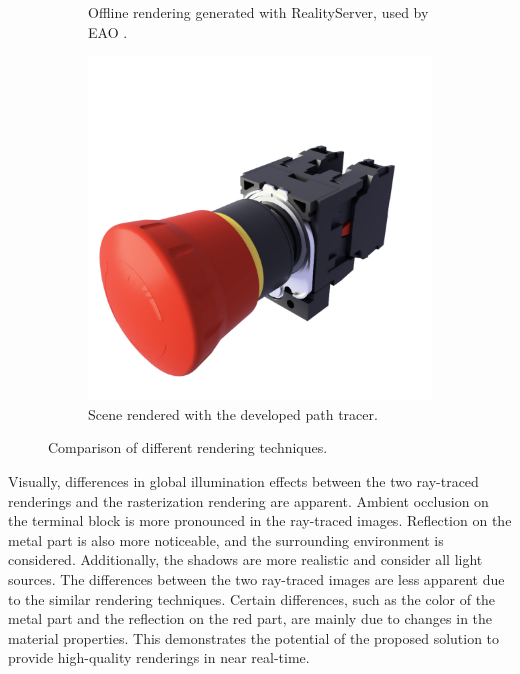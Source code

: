 \begin{figure}[H]
\begin{subfigure}[t]{0.3\textwidth}
    \caption{Offline rendering generated with \gls{RealityServer}, used by EAO \cite{eaoProductReference}.}
    \label{fig:offline-rendering}
  \end{subfigure}
  \hfill
  \begin{subfigure}[t]{0.3\textwidth}
    \includegraphics[width=\textwidth]{resources/comparison-strahl-rendering.png}
    \caption{Scene rendered with the developed path tracer.}
    \label{fig:strahl-rendering}
  \end{subfigure}
  \caption{Comparison of different rendering techniques.}
  \label{fig:final-rendering-comparison}
\end{figure}

Visually, differences in global illumination effects between the two ray-traced renderings and the rasterization rendering are apparent. Ambient occlusion on the terminal block is more pronounced in the ray-traced images. Reflection on the metal part is also more noticeable, and the surrounding environment is considered. Additionally, the shadows are more realistic and consider all light sources. The differences between the two ray-traced images are less apparent due to the similar rendering techniques. Certain differences, such as the color of the metal part and the reflection on the red part, are mainly due to changes in the material properties. This demonstrates the potential of the proposed solution to provide high-quality renderings in near real-time.

